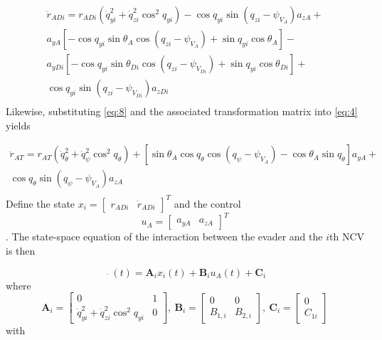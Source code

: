 \begin{equation}
\label{eq:10}
\begin{gathered}
  {{\ddot r}_{ADi}} = {r_{ADi}}\left( {\dot q_{yi}^2 + \dot q_{zi}^2{{\cos }^2}{q_{yi}}} \right) - \cos {q_{yi}}\sin \left( {{q_{zi}} - {\psi _{{V_A}}}} \right){a_{zA}} +  \\ 
  {a_{yA}}\left[ { - \cos {q_{yi}}\sin {\theta _A}\cos \left( {{q_{zi}} - {\psi _{{V_A}}}} \right) + \sin {q_{yi}}\cos {\theta _A}} \right] -  \\ 
  {a_{yDi}}\left[ { - \cos {q_{yi}}\sin {\theta _{Di}}\cos \left( {{q_{zi}} - {\psi _{{V_{Di}}}}} \right) + \sin {q_{yi}}\cos {\theta _{Di}}} \right] +  \\ 
  \cos {q_{yi}}\sin \left( {{q_{zi}} - {\psi _{{V_{Di}}}}} \right){a_{zDi}} \\ 
\end{gathered}
\end{equation}
Likewise, substituting \eqref{eq:8} and the associated transformation matrix into \eqref{eq:4} yields

\begin{equation}
\label{eq:11}
\begin{gathered}
  {{\ddot r}_{AT}} = {r_{AT}}\left( {\dot q_\theta ^2 + \dot q_\psi ^2{{\cos }^2}{q_\theta }} \right) + \left[ {\sin {\theta _A}\cos {q_\theta }\cos \left( {{q_\psi } - {\psi _{{V_A}}}} \right) - \cos {\theta _A}\sin {q_\theta }} \right]{a_{yA}} +  \\ 
  \cos {q_\theta }\sin \left( {{q_\psi } - {\psi _{{V_A}}}} \right){a_{zA}} \\ 
\end{gathered}
\end{equation}
Define the state ${x_i} = {\left[ {\begin{array}{*{20}{c}}
  {{r_{ADi}}}&{{{\dot r}_{ADi}}} 
\end{array}} \right]^T}$ and the control\[{u_A} = {\left[ {\begin{array}{*{20}{c}}
  {{a_{yA}}}&{{a_{zA}}} 
\end{array}} \right]^T}\]. The state-space equation of the interaction between the evader and the $i$th NCV is then

\begin{equation}
\label{eq:12}
\mathop {{x_i}}\limits^. (t) = {{\mathbf{A}}_i}{x_i}(t) + {{\mathbf{B}}_i}{u_A}(t) + {{\mathbf{C}}_i}
\end{equation}
where
\[{{\mathbf{A}}_i} = \left[ {\begin{array}{*{20}{c}}
  0&1 \\ 
  {\dot q_{yi}^2 + \dot q_{zi}^2{{\cos }^2}{q_{yi}}}&0 
\end{array}} \right],\ {{\mathbf{B}}_i} = \left[ {\begin{array}{*{20}{c}}
  0&0 \\ 
  {{B_{1,i}}}&{{B_{2,i}}} 
\end{array}} \right],\ {{\mathbf{C}}_i} = \left[ {\begin{array}{*{20}{c}}
  0 \\ 
  {{C_{1i}}} 
\end{array}} \right]\]
with


